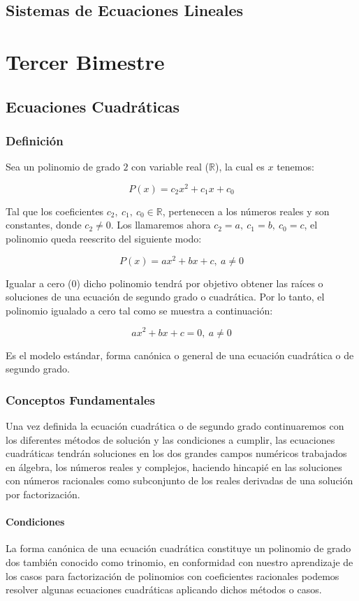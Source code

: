 \documentclass[letterpaper, 10pt, oneside]{book}
\begin{document}
	\chapter{Sistemas de Ecuaciones Lineales}
	\part{Tercer Bimestre}
	\chapter{Ecuaciones Cuadráticas}
	\section{Definición}
	Sea un polinomio de grado $2$ con variable real ($\displaystyle{\mathbb{R}}$), la cual es $x$ tenemos: 
	
	$$P(x)=c_2x^2+c_1x+c_0$$
	
	Tal que los coeficientes $\displaystyle{c_2, \ c_1, \ c_0 \in \mathbb{R}}$, pertenecen a los números reales y son constantes, donde $c_2 \neq 0$. Los llamaremos ahora $c_2 = a, \ c_1 = b, \ c_0 = c$, el polinomio queda reescrito del siguiente modo:
	
	$$P(x)=ax^2+bx+c, \ a \neq 0$$
	
	Igualar a cero (0) dicho polinomio tendrá por objetivo obtener las raíces o soluciones de una ecuación de segundo grado o cuadrática. Por lo tanto, el polinomio igualado a cero tal como se muestra a continuación: 
	
	$$ax^2+bx+c=0, \ a \neq 0$$
	
	Es el modelo estándar, forma canónica o    general de una ecuación cuadrática o de segundo grado. 
	
	\section{Conceptos Fundamentales}
	Una vez definida la ecuación cuadrática o de segundo grado continuaremos con los diferentes métodos de solución y las condiciones a cumplir, las ecuaciones cuadráticas tendrán soluciones en los dos grandes campos numéricos trabajados en álgebra, los números reales y complejos, haciendo hincapié en las soluciones con números racionales como subconjunto de los reales derivadas de una solución por factorización. 
	
	\subsection{Condiciones}
	La forma canónica de una ecuación cuadrática constituye un polinomio de grado dos también conocido como trinomio, en conformidad con nuestro aprendizaje de los casos para factorización de polinomios con coeficientes racionales podemos resolver algunas ecuaciones cuadráticas aplicando dichos métodos o casos. 
	
\end{document}
